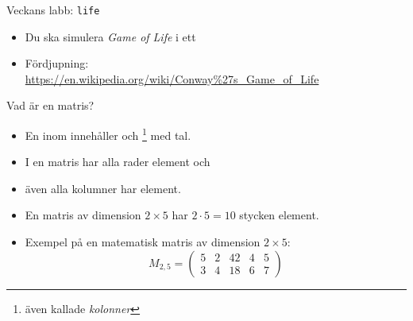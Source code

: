 \begin{Slide}{Veckans labb: \texttt{life}}
\begin{minipage}{0.5\textwidth}
  \begin{itemize}\SlideFontTiny
  \item Du ska simulera \emph{Game of Life} i ett 
  \item Fördjupning:\\{\SlideFontTiny\url{https://en.wikipedia.org/wiki/Conway%27s_Game_of_Life}}
  \end{itemize}
\end{minipage}%

\end{Slide}







\begin{Slide}{Vad är en matris?}\SlideFontSmall
\begin{itemize}

\item En  inom  innehåller  och \footnote{även kallade \emph{kolonner}} med tal.

\item I en  matris har alla rader  element och

\item även alla kolumner har  element.

\item En matris av dimension $2\times{}5$ har $2 \cdot 5 = 10$ stycken element.

\item Exempel på en matematisk matris av dimension $2\times{}5$:
\[
M_{2,5}=
  \begin{pmatrix}
    5 & 2 & 42 & 4 & 5 \\
    3 & 4 & 18 & 6 & 7
  \end{pmatrix}
\]
\end{itemize}
\end{Slide}

